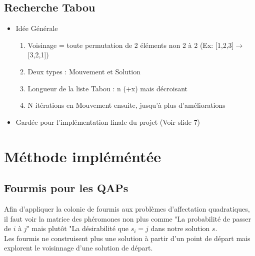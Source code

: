 \documentclass[b]{beamer}
\begin{document}
\subsection{Recherche Tabou}
\begin{frame}
	\begin{itemize}
		\item Idée Générale\\
		\begin{enumerate}
			\item Voisinage = toute permutation de 2 éléments non 2 à 2 (Ex: [1,2,3]$\rightarrow$[3,2,1])
			\item Deux types : Mouvement et Solution
			\item Longueur de la liste Tabou : n (+x) mais décroisant
			\item N itérations en Mouvement ensuite, jusqu'à plus d'améliorations
		\end{enumerate}
		\item Gardée pour l'implémentation finale du projet (Voir slide 7)
	\end{itemize}
\end{frame}


\section{Méthode impléméntée}
\subsection{Fourmis pour les QAPs}
\begin{frame}

Afin d'appliquer la colonie de fourmis aux problèmes d'affectation quadratiques, il faut voir la matrice des phéromones non plus comme "La probabilité de passer de $i$ à $j$" mais plutôt "La désirabilité que $s_i=j$ dans notre solution $s$. \\
Les fourmis ne construisent plus une solution à partir d'un point de départ mais explorent le voisinnage d'une solution de départ.\\
\end{frame}
\end{document}
